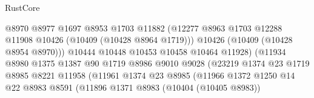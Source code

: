 \begin{lexlean}{RustCore}
\begin{coremodule}
                                          @8970
                                          @8977
                                          @1697
                                          @8953
                                          @1703
                                          @11882
                                          (@12277
                                            @8963
                                            @1703
                                            @12288
                                            @11908
                                            @10426
                                            (@10409 (@10428 @8964 @1719)))
                                          @10426
                                          (@10409 (@10428 @8954 @8970)))
                                        @10444
                                        @10448
                                        @10453
                                        @10458
                                        @10464
                                        @11928)
                                      (@11934
                                        @8980
                                        @1375
                                        @1387
                                        @90
                                        @1719
                                        @8986
                                        @9010
                                        @9028
                                        (@23219
                                          @1374
                                          @23
                                          @1719
                                          @8985
                                          @8221
                                          @11958
                                          (@11961
                                            @1374
                                            @23
                                            @8985
                                            (@11966
                                              @1372
                                              @1250
                                              @14
                                              @22
                                              @8983
                                              @8591
                                              (@11896
                                                @1371
                                                @8983
                                                (@10404 (@10405 @8983))

\end{coremodule}
\end{lexlean}
